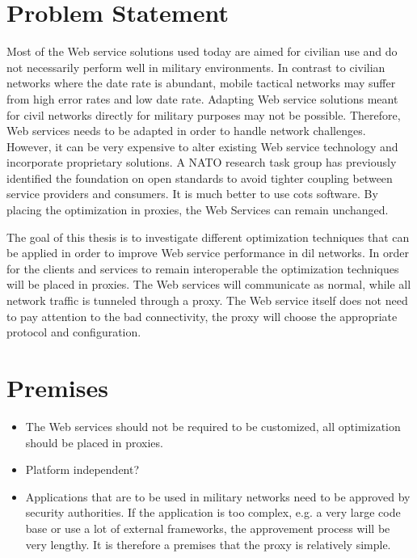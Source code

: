 \section{Problem Statement}
Most of the Web service solutions used today are aimed for civilian use and do
not necessarily perform well in military environments. In contrast to civilian
networks where the date rate is abundant, mobile tactical networks may suffer
from high error rates and low date rate. Adapting Web service solutions meant
for civil networks directly for military purposes may not be possible.
Therefore, Web services needs to be adapted in order to handle network
challenges. However, it can be very expensive to alter existing Web service
technology and incorporate proprietary solutions. A NATO research task group has
previously identified the foundation on open standards to avoid tighter coupling
between service providers and consumers\cite{ist-090}. It is much better to use
\gls{cots} software. By placing the optimization in proxies, the
Web Services can remain unchanged.

The goal of this thesis is to investigate different optimization techniques that
can be applied in order to improve Web service performance in \gls{dil}
networks. In order for the clients and services to remain interoperable the
optimization techniques will be placed in proxies. The Web services will
communicate as normal, while all network traffic is tunneled through a proxy.
The Web service itself does not need to pay attention to the bad connectivity,
the proxy will choose the appropriate protocol and configuration.

\section{Premises}
\begin{itemize}

\item The Web services should not be required to be customized, all
optimization should be placed in proxies.

\item Platform independent?

\item Applications that are to be used in military networks need to be approved
by security authorities. If the application is too complex, e.g.  a very large
code base or use a lot of external frameworks, the approvement process will be
very lengthy. It is therefore a premises that the proxy is relatively simple.

\end{itemize}

